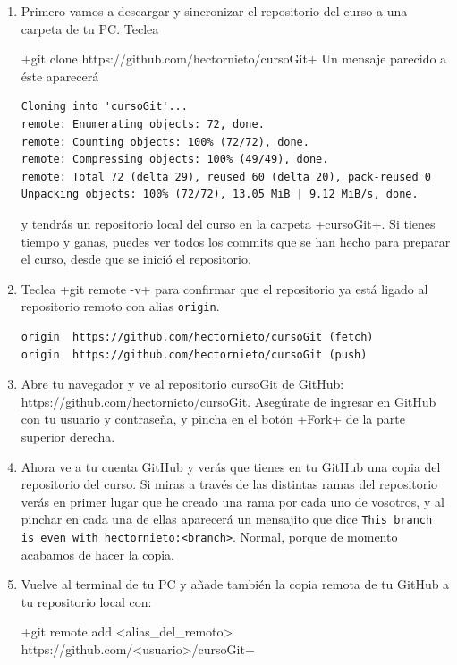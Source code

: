 \documentclass[a5paper,10pt]{article}
\begin{document}
  \begin{enumerate}
   \item Primero vamos a descargar y sincronizar el repositorio del curso a una carpeta de tu PC. Teclea
   
   \cverb+git clone https://github.com/hectornieto/cursoGit+
   Un mensaje parecido a éste aparecerá 
   
   \begin{lstlisting}[style=custom]
Cloning into 'cursoGit'...
remote: Enumerating objects: 72, done.
remote: Counting objects: 100% (72/72), done.
remote: Compressing objects: 100% (49/49), done.
remote: Total 72 (delta 29), reused 60 (delta 20), pack-reused 0
Unpacking objects: 100% (72/72), 13.05 MiB | 9.12 MiB/s, done.
   \end{lstlisting}
   y tendrás un repositorio local del curso en la carpeta \cverb+cursoGit+. Si tienes tiempo y ganas, puedes ver todos los commits que se han hecho para preparar el curso, desde que se inició el repositorio.
   
   \item Teclea \cverb+git remote -v+ para confirmar que el repositorio ya está ligado al repositorio remoto con alias \verb+origin+.
   
   \begin{lstlisting}[style=custom]
origin	https://github.com/hectornieto/cursoGit (fetch)
origin	https://github.com/hectornieto/cursoGit (push)
   \end{lstlisting}
   
   \item Abre tu navegador y ve al repositorio cursoGit de GitHub: \url{https://github.com/hectornieto/cursoGit}. Asegúrate de ingresar en GitHub con tu usuario y contraseña, y pincha en el botón \cverb+Fork+ de la parte superior derecha.
   
   \item Ahora ve a tu cuenta GitHub y verás que tienes en tu GitHub una copia del repositorio del curso. Si miras a través de las distintas ramas del repositorio verás en primer lugar que he creado una rama por cada uno de vosotros, y al pinchar en cada una de ellas aparecerá un mensajito que dice \verb+This branch is even with hectornieto:<branch>+. Normal, porque de momento acabamos de hacer la copia.
   
   \item Vuelve al terminal de tu PC y añade también la copia remota de tu GitHub a tu repositorio local con:
   
   \hspace{-3cm}\cverb+git remote add <alias_del_remoto> https://github.com/<usuario>/cursoGit+
   

\end{enumerate}
\end{document}
